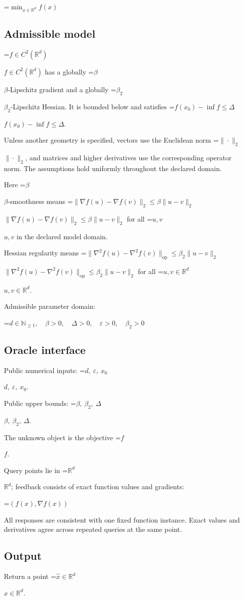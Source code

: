 \documentclass[10pt,a4paper]{article}
\newcommand{\AtlasMath}[1]{\par\begingroup\centering\setbox0=\hbox{$\displaystyle #1$}\ifdim\wd0>1.4\linewidth\typeout{ATLAS WIDE FORMULA: \the\wd0}\fi\ifdim\wd0>\linewidth\resizebox{\linewidth}{!}{\box0}\else\box0\fi\par\endgroup}
\newcommand{\AtlasInlineMath}[1]{\begingroup\setbox0=\hbox{$#1$}\ifdim\wd0>.4\linewidth\endgroup\AtlasMath{#1}\else\endgroup$#1$\fi}
\begin{document}
\AtlasMath{\min_{x\in \mathbb{R}^d}f(x)}


\subsection{Admissible model}
\AtlasInlineMath{f\in C^2(\mathbb R^d)} has a globally \AtlasInlineMath{\beta}-Lipschitz gradient and a globally \AtlasInlineMath{\beta_2}-Lipschitz Hessian. It is bounded below and satisfies \AtlasInlineMath{f(x_0)-\inf f\le\Delta}.

Unless another geometry is specified, vectors use the Euclidean norm \AtlasInlineMath{\|\cdot\|_2}, and matrices and higher derivatives use the corresponding operator norm. The assumptions hold uniformly throughout the declared domain.

Here \AtlasInlineMath{\beta}-smoothness means \AtlasInlineMath{\|\nabla f(u)-\nabla f(v)\|_2\le\beta\|u-v\|_2} for all \AtlasInlineMath{u,v} in the declared model domain.

Hessian regularity means \AtlasInlineMath{\|\nabla^2 f(u)-\nabla^2 f(v)\|_{\mathrm{op}}\le\beta_2\|u-v\|_2} for all \AtlasInlineMath{u,v\in\mathbb R^d}.

Admissible parameter domain:


\AtlasMath{d\in\mathbb{N}_{\ge1},\quad \beta>0,\quad \Delta>0,\quad \varepsilon>0,\quad \beta_2>0}


\subsection{Oracle interface}
Public numerical inputs: \AtlasInlineMath{d,\ \varepsilon,\ x_0}.

Public upper bounds: \AtlasInlineMath{\beta,\ \beta_2,\ \Delta}.

The unknown object is the objective \AtlasInlineMath{f}.

Query points lie in \AtlasInlineMath{\mathbb{R}^d}; feedback consists of exact function values and gradients:


\AtlasMath{(f(x),\nabla f(x))}


All responses are consistent with one fixed function instance. Exact values and derivatives agree across repeated queries at the same point.

\subsection{Output}
Return a point \AtlasInlineMath{\widehat x\in\mathbb R^d}.
\end{document}

